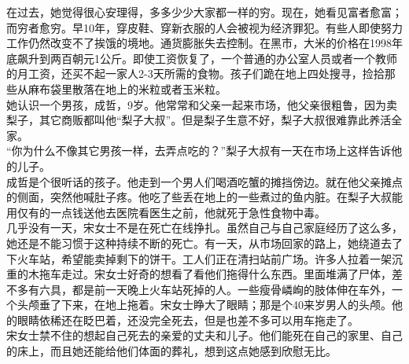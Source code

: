 在过去，她觉得很心安理得，多多少少大家都一样的穷。现在，她看见富者愈富；而穷者愈穷。早10年，穿皮鞋、穿新衣服的人会被视为经济罪犯。有些人即使努力工作仍然改变不了挨饿的境地。通货膨胀失去控制。在黑市，大米的价格在1998年底飙升到两百朝元1公斤。即使工资恢复了，一个普通的办公室人员或者一个教师的月工资，还买不起一家人2-3天所需的食物。孩子们跪在地上四处搜寻，捡拾那些从麻布袋里散落在地上的米粒或者玉米粒。\\

她认识一个男孩，成哲，9岁。他常常和父亲一起来市场，他父亲很粗鲁，因为卖梨子，其它商贩都叫他“梨子大叔”。但是梨子生意不好，梨子大叔很难靠此养活全家。\\

“你为什么不像其它男孩一样，去弄点吃的？”梨子大叔有一天在市场上这样告诉他的儿子。\\

成哲是个很听话的孩子。他走到一个男人们喝酒吃蟹的摊挡傍边。就在他父亲摊点的侧面，突然他喊肚子疼。他吃了些丢在地上的一些煮过的鱼内脏。在梨子大叔能用仅有的一点钱送他去医院看医生之前，他就死于急性食物中毒。\\

几乎没有一天，宋女士不是在死亡在线挣扎。虽然自己与自己家庭经历了这么多，她还是不能习惯于这种持续不断的死亡。有一天，从市场回家的路上，她绕道去了下火车站，希望能卖掉剩下的饼干。工人们正在清扫站前广场。许多人拉着一架沉重的木拖车走过。宋女士好奇的想看了看他们拖得什么东西。里面堆满了尸体，差不多有六具，都是前一天晚上火车站死掉的人。一些瘦骨嶙峋的肢体伸在车外，一个头颅垂了下来，在地上拖着。宋女士睁大了眼睛；那是个40来岁男人的头颅。他的眼睛依稀还在眨巴着，还没完全死去，但是也差不多可以用车拖走了。\\

宋女士禁不住的想起自己死去的亲爱的丈夫和儿子。他们能死在自己的家里、自己的床上，而且她还能给他们体面的葬礼，想到这点她感到欣慰无比。\\
